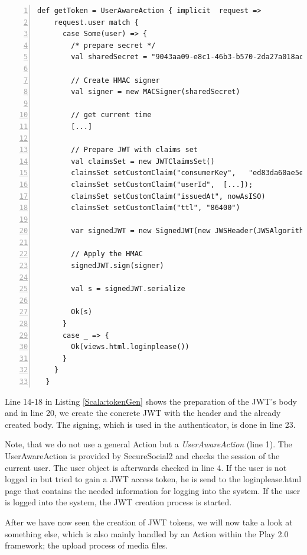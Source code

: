 \begin{lstlisting}[numbers=left,caption={Generation of JWT tokens within the backend},label=Scala:tokenGen,frame=tlbr,breaklines]
def getToken = UserAwareAction { implicit  request =>
    request.user match {
      case Some(user) => {
        /* prepare secret */
        val sharedSecret = "9043aa09-e8c1-46b3-b570-2da27a018ac3" getBytes

        // Create HMAC signer
        val signer = new MACSigner(sharedSecret)

        // get current time
        [...]

        // Prepare JWT with claims set
        val claimsSet = new JWTClaimsSet()
        claimsSet setCustomClaim("consumerKey",   "ed83da60ae5e4d159729eef16a207525")
        claimsSet setCustomClaim("userId",  [...]);
        claimsSet setCustomClaim("issuedAt", nowAsISO)
        claimsSet setCustomClaim("ttl", "86400")

        var signedJWT = new SignedJWT(new JWSHeader(JWSAlgorithm.HS256), claimsSet)

        // Apply the HMAC
        signedJWT.sign(signer)

        val s = signedJWT.serialize

        Ok(s)
      }
      case _ => {
        Ok(views.html.loginplease())
      }
    }
  }
\end{lstlisting}

Line 14-18 in Listing \ref{Scala:tokenGen} shows the preparation of the JWT's body and in line 20, we create the concrete JWT with the header and the already created body. The signing, which is used in the authenticator, is done in line 23. 

Note, that we do not use a general Action but a \emph{UserAwareAction} (line 1).
The UserAwareAction is provided by SecureSocial2 and checks the session of the current user. The user object is afterwards checked in line 4. If the user is not logged in but tried to gain a JWT access token, he is send to the loginplease.html page that contains the needed information for logging into the system. If the user is logged into the system, the JWT creation process is started.

After we have now seen the creation of JWT tokens, we will now take a look at something else, which is also mainly handled by an Action within the Play 2.0 framework; the upload process of media files. 

